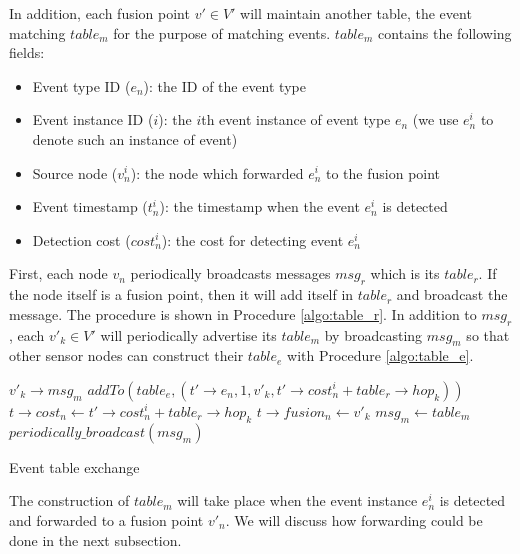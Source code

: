In addition, each fusion point \(v'\in V'\) will maintain another table, the event matching \(table_m\) for the purpose of matching events. \(table_m\) contains the following fields:
\begin{itemize}
\item Event type ID (\(e_n\)): the ID of the event type
\item Event instance ID (\(i\)): the \(i\)th event instance of event type \(e_n\) (we use \(e_n^i\) to denote such an instance of event)
\item Source node (\(v_n^i\)): the node which forwarded \(e_n^i\) to the fusion point
\item Event timestamp (\(t_n^i\)): the timestamp when the event \(e_n^i\) is detected
\item Detection cost (\(cost_n^i\)): the cost for detecting event \(e_n^i\)
\end{itemize}

First, each node \(v_n\) periodically broadcasts messages \(msg_r\) which is its \(table_r\). If the node itself is a fusion point, then it will add itself in \(table_r\) and broadcast the message. The procedure is shown in Procedure \ref{algo:table_r}. In addition to \(msg_r\), each \(v'_k\in V'\) will periodically advertise its \(table_m\) by broadcasting \(msg_m\) so that other sensor nodes can construct their \(table_e\) with Procedure \ref{algo:table_e}.

\begin{algorithm}
\begin{algorithmic}
\REQUIRE \(v'_k\rightarrow msg_m\)
			\STATE \(addTo(table_e, (t'\rightarrow e_n, 1, v'_k, t'\rightarrow cost_n^i+table_r\rightarrow hop_k))\)
		\ENDIF
					\STATE \(t\rightarrow cost_n \gets t'\rightarrow cost_n^i+table_r\rightarrow hop_k\)
					\STATE \(t\rightarrow fusion_n \gets v'_k\)
				\ENDIF
			\ENDIF
		\ENDFOR
	\ENDFOR
		\STATE \(msg_m \gets table_m\)
		\STATE \(periodically\_broadcast(msg_m)\)
	\ENDIF
\end{algorithmic}
\caption{Event table exchange}
\label{algo:table_e}
\end{algorithm}

The construction of \(table_m\) will take place when the event instance \(e_n^i\) is detected and forwarded to a fusion point \(v'_n\). We will discuss how forwarding could be done in the next subsection.

